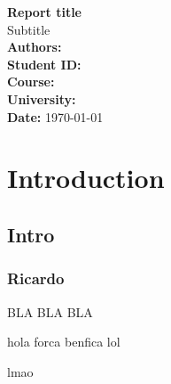 \documentclass[12pt,a4paper]{article}
\begin{document}
\begin{titlepage}
    \centering
    \vspace*{3cm}
    
    {\LARGE \textbf{Report title}}\\[0.5cm]
    {\large Subtitle}\\[2cm]
    
    \textbf{Authors:} \\
    \textbf{Student ID:} \\
    \textbf{Course:} \\
    \textbf{University:} \\
    \textbf{Date:} \today
    
    \vfill
\end{titlepage}

\tableofcontents
\newpage

\section{Introduction}
\subsection{Intro}
\subsubsection{Ricardo}

BLA BLA BLA \cite{verdi2021}

hola
forca benfica lol

lmao \cite{rossi2020}
\printbibliography
\end{document}
